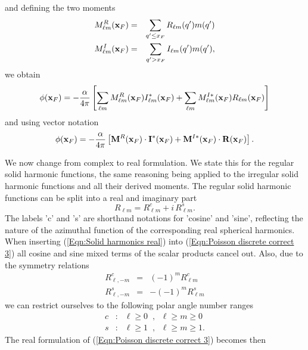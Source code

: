 and defining the two moments
\begin{eqnarray}
M^R_{\ell m}({\bf x}_F) & = & \sum_{q'\leq x_F} R_{\ell m}(q')m(q') \label{Eqn:Moment definition 1} \\
M^I_{\ell m}({\bf x}_F) & = & \sum_{q'>x_F} I_{\ell m}(q')m(q'),\label{Eqn:Moment definition 2}
\end{eqnarray}
we obtain
\begin{equation}
\label{Eqn:Poisson discrete correct 2}
\phi({\bf x}_F) = -{\alpha\over 4\pi}\left[
\sum_{\ell m}M^R_{\ell m}({\bf x}_F)I_{\ell m}^*({\bf x}_F)
+ \sum_{\ell m}M^{I*}_{\ell m}({\bf x}_F)R_{\ell m}({\bf x}_F)\right]
\end{equation}
and using vector notation
\begin{equation}
\label{Eqn:Poisson discrete correct 3}
\phi({\bf x}_F) = -{\alpha\over 4\pi}\left[
{\bf M}^R({\bf x}_F)\cdot {\bf I}^*({\bf x}_F) + {\bf M}^{I*}({\bf x}_F)\cdot {\bf R}({\bf x}_F)
\right].
\end{equation}
\par
We now change from complex to real formulation. We state this for the regular
solid harmonic functions, the same reasoning being applied to the irregular
solid harmonic functions and all their derived moments. The regular solid
harmonic functions can be split into a real and imaginary part
\begin{equation}
\label{Eqn:Solid harmonics real}
R_{\ell m} = R_{\ell m}^c + i\,R_{\ell m}^s.
\end{equation} 
The labels 'c' and 's' are shorthand notations for 'cosine' and 'sine',
reflecting the nature of the azimuthal function of the corresponding real
spherical harmonics. When inserting (\ref{Eqn:Solid harmonics real}) into
(\ref{Eqn:Poisson discrete correct 3}) all cosine and sine mixed terms of the
scalar products cancel out. Also, due to the symmetry relations
\begin{eqnarray}
R_{\ell,-m}^c & = & (-1)^m R_{\ell m}^c \\
R_{\ell,-m}^s & = & -(-1)^m R_{\ell m}^s
\end{eqnarray} 
we can restrict ourselves to the following polar angle number ranges
\begin{eqnarray}
c & : & \ell\geq 0\;\;,\;\;\ell\geq m \geq 0 \\
s & : & \ell\geq 1\;\;,\;\;\ell\geq m \geq 1.
\end{eqnarray}
The real formulation of (\ref{Eqn:Poisson discrete correct 3}) becomes then
